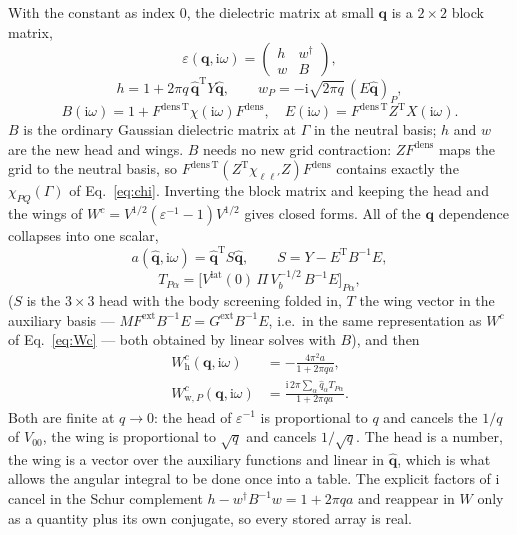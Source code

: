 \documentclass[%
 reprint,
superscriptaddress,
 amsmath,amssymb,
 aps,
prb,
]{revtex4-2}
\newcommand{\bq}{\mathbf{q}}
\newcommand{\qhat}{\hat{\mathbf{q}}}
\newcommand{\ii}{\mathrm{i}}
\newcommand{\Tr}{\mathrm{T}}
\newcommand{\head}{\mathrm{h}}
\newcommand{\wing}{\mathrm{w}}
\newcommand{\lat}{\mathrm{lat}}
\newcommand{\dens}{\mathrm{dens}}
\newcommand{\ext}{\mathrm{ext}}
\begin{document}
With the constant as index 0, the dielectric matrix at small $\bq$ is a $2\times2$ block matrix,
\begin{equation}
  \varepsilon(\bq,\ii\omega) = \begin{pmatrix} h & w^\dagger\\ w & B\end{pmatrix},
  \label{eq:blocks}
\end{equation}
\begin{equation}
  h = 1 + 2\pi q\,\qhat^\Tr Y\qhat,\qquad
  w_P = -\ii\sqrt{2\pi q}\,(E\qhat)_P,
  \label{eq:hw}
\end{equation}
\begin{equation}
  B(\ii\omega) = 1 + F^{\dens\,\Tr}\chi(\ii\omega)F^\dens,\quad
  E(\ii\omega) = F^{\dens\,\Tr}Z^\Tr X(\ii\omega).
  \label{eq:E}
\end{equation}
$B$ is the ordinary Gaussian dielectric matrix at $\Gamma$ in the neutral basis; $h$ and $w$
are the new head and wings. $B$ needs no new grid contraction: $Z F^\dens$ maps the grid to the
neutral basis, so $F^{\dens\,\Tr}(Z^\Tr\chi_{\ell\ell'}Z)F^\dens$ contains exactly the
$\chi_{PQ}(\Gamma)$ of Eq.~\eqref{eq:chi}. Inverting the block matrix and keeping the head and
the wings of $W^c = V^{1/2}(\varepsilon^{-1}-1)V^{1/2}$ gives closed forms. All of the $\bq$
dependence collapses into one scalar,
\begin{equation}
  a(\qhat,\ii\omega) = \qhat^\Tr S\qhat,\qquad
  S = Y - E^\Tr B^{-1}E,
  \label{eq:a}
\end{equation}
\begin{equation}
  T_{P\alpha} = \big[V^\lat(0)\,\Pi\,V_b^{-1/2}\,B^{-1}E\big]_{P\alpha},
  \label{eq:ST}
\end{equation}
($S$ is the $3\times3$ head with the body screening folded in, $T$ the wing vector in the
auxiliary basis --- $M F^\ext B^{-1}E = G^\ext B^{-1}E$, i.e.\ in the same representation as
$W^c$ of Eq.~\eqref{eq:Wc} --- both obtained by linear solves with $B$), and then
\begin{align}
  W^{c}_{\head}(\bq,\ii\omega) &= -\frac{4\pi^2 a}{1+2\pi q a},
  \label{eq:headwing}\\
  W^{c}_{\wing,P}(\bq,\ii\omega) &= \frac{\ii\,2\pi\sum_\alpha\hat q_\alpha T_{P\alpha}}{1+2\pi q a}.
  \label{eq:wing}
\end{align}
Both are finite at $q\to0$: the head of $\varepsilon^{-1}$ is proportional to $q$ and cancels
the $1/q$ of $V_{00}$, the wing is proportional to $\sqrt q$ and cancels $1/\sqrt q$. The head is
a number, the wing is a vector over the auxiliary functions and linear in $\qhat$, which is what
allows the angular integral to be done once into a table. The explicit factors of $\ii$ cancel
in the Schur complement $h - w^\dagger B^{-1}w = 1+2\pi q a$ and reappear in $W$ only as a
quantity plus its own conjugate, so every stored array is real.
\end{document}
